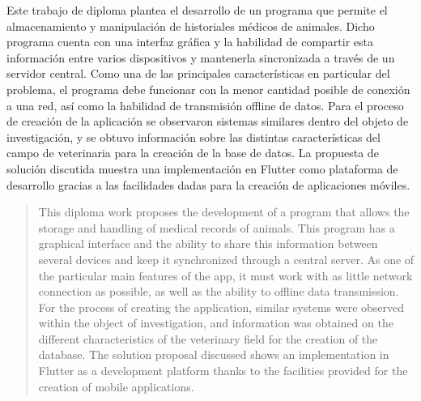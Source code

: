 \begin{resumen}
	Este trabajo de diploma plantea el desarrollo de un programa que permite el almacenamiento y manipulaci\'on de historiales m\'edicos de animales. Dicho programa cuenta con una interfaz gr\'afica y la habilidad de compartir esta informaci\'on entre varios dispositivos y mantenerla sincronizada a trav\'es de un servidor central.
	Como una de las principales caracter\'isticas en particular del problema, el programa debe funcionar con la menor cantidad posible de conexi\'on a una red, as\'i como la habilidad de transmisi\'on offline de datos.
	 Para el proceso de creaci\'on de la aplicaci\'on se observaron sistemas similares dentro del objeto de investigaci\'on, y se obtuvo informaci\'on sobre las distintas caracter\'isticas del campo de veterinaria para la creaci\'on de la base de datos.
	La propuesta de soluci\'on discutida muestra una implementaci\'on en Flutter como plataforma de desarrollo gracias a las facilidades dadas para la creaci\'on de aplicaciones m\'oviles.   
	
\end{resumen}




\begin{abstract}
	This diploma work proposes the development of a program that allows the storage and handling of medical records of animals. This program has a graphical interface and the ability to share this information between several devices and keep it synchronized through a central server.
As one of the particular main features of the app, it must work with as little network connection as possible, as well as the ability to offline data transmission.
For the process of creating the application, similar systems were observed within the object of investigation, and information was obtained on the different characteristics of the veterinary field for the creation of the database.
The solution proposal discussed shows an implementation in Flutter as a development platform thanks to the facilities provided for the creation of mobile applications.
\end{abstract}